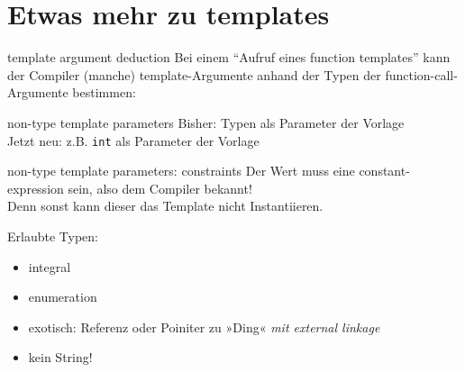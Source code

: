 \section{Etwas mehr zu templates}

\begin{frame}[t]{template argument deduction}
	Bei einem \enquote{Aufruf eines function templates} kann der Compiler (manche) template-Argumente anhand der Typen der function-call-Argumente bestimmen:
	
	\onslide*<+> {  }
	\onslide<+-> {  }
\end{frame}

\begin{frame}[t]{non-type template parameters}
	Bisher: Typen als Parameter der Vorlage\\
	\onslide<2> { Jetzt neu: z.B. \texttt{int} als Parameter der Vorlage }
	
	 {  }
	\onslide<2> {  }
\end{frame}

\begin{frame}{non-type template parameters: constraints}
	Der Wert muss eine constant-expression sein, also dem Compiler bekannt!	\\
	Denn sonst kann dieser das Template nicht Instantiieren.
	
	\vspace{2em}
	
	Erlaubte Typen:
	\begin{itemize}
		\item integral
		\item enumeration
		\item exotisch: Referenz oder Poiniter zu »Ding« \emph{mit external linkage}
		\item kein String!
	\end{itemize}
\end{frame}
